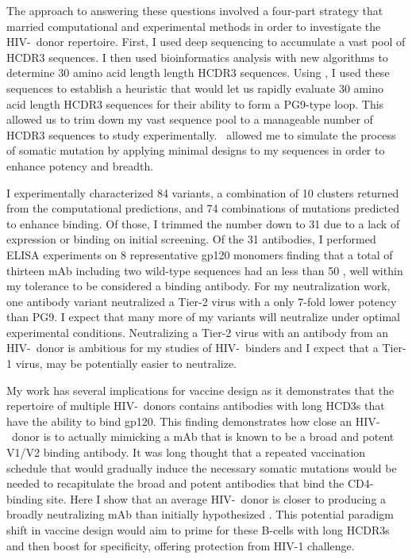 The approach to answering these questions involved a four-part strategy that married computational and experimental methods in order to investigate the HIV-\naive~donor repertoire. First, I used deep sequencing to accumulate a vast pool of HCDR3 sequences. I then used bioinformatics analysis with new algorithms to determine 30 amino acid length length HCDR3 sequences. Using \rosetta, I used these sequences to establish a heuristic that would let us rapidly evaluate 30 amino acid length HCDR3 sequences for their ability to form a PG9-type loop. This allowed us to trim down my vast sequence pool to a manageable number of HCDR3 sequences to study experimentally. \rosettadesign~allowed me to simulate the process of somatic mutation by applying minimal designs to my sequences in order to enhance potency and breadth.

I experimentally characterized 84 variants, a combination of 10 clusters returned from the computational predictions, and 74 combinations of mutations predicted to enhance binding. Of those, I trimmed the number down to 31 due to a lack of expression or binding on initial screening. Of the 31 antibodies, I performed ELISA experiments on 8 representative gp120 monomers finding that a total of thirteen mAb including two wild-type sequences had an \ec less than 50 \mcml, well within my tolerance to be considered a binding antibody. For my neutralization work, one antibody variant neutralized a Tier-2 virus with a only 7-fold lower potency than PG9. I expect that many more of my variants will neutralize under optimal experimental conditions. Neutralizing a Tier-2 virus with an antibody from an HIV-\naive~donor is ambitious for my studies of HIV-\naive~binders and I expect that a Tier-1 virus, may be potentially easier to neutralize.

My work has several implications for vaccine design as it demonstrates that the repertoire of multiple HIV-\naive~donors contains antibodies with long HCD3s that have the ability to bind gp120. This finding  demonstrates how close an HIV-\naive~donor is to actually mimicking a mAb that is known to be a broad and potent V1/V2 binding antibody. It was long thought that a repeated vaccination schedule that would gradually induce the necessary somatic mutations would be needed to recapitulate the broad and potent antibodies that bind the CD4-binding site. Here I show that an average HIV-\naive~donor is closer to producing a broadly neutralizing mAb than initially hypothesized \citep{Mikell:2011hr}. This potential paradigm shift in vaccine design would aim to prime for these B-cells with long HCDR3s and then boost for specificity, offering protection from HIV-1 challenge.

